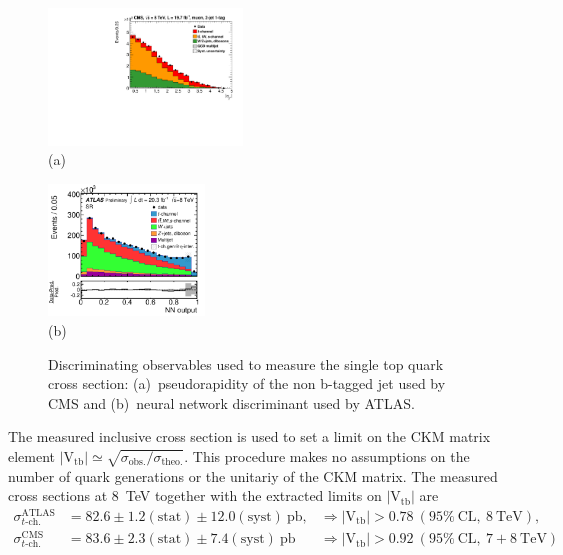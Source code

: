 \documentclass{PoS}
\begin{document}
\begin{figure}[htbp]
\begin{center}
\parbox[t]{0.5\textwidth}{\centering\includegraphics[width=0.46\textwidth]{cms_xsec8/etamuon.pdf}\\(a)}
\parbox[t]{0.42\textwidth}{\centering\includegraphics[width=0.37\textwidth]{atlas_xsec8/nnoutput.pdf}\\(b)}

\end{center}
\caption{\label{fig:fit-xsec-8}Discriminating observables used to measure the single top quark cross section: (a)~pseudorapidity of the non b-tagged jet used by CMS and (b)~neural network discriminant used by ATLAS.}

\end{figure}

The measured inclusive cross section is used to set a limit on the CKM matrix element $|\mathrm{V_{tb}}|\simeq\sqrt{\sigma_\mathrm{obs.}/\sigma_\mathrm{theo.}}$. This procedure makes no assumptions on the number of quark generations or the unitariy of the CKM matrix. The measured cross sections at 8~TeV together with the extracted limits on $\mathrm{|V_{tb}|}$ are 
\begin{align}
\sigma_{t\mbox{-}\mathrm{ch.}}^\mathrm{ATLAS}&=82.6\pm1.2\mathrm{(stat)}\pm12.0\mathrm{(syst)}~\mathrm{pb}, &\Rightarrow |\mathrm{V_{tb}}|>0.78~\mathrm{(95\%~CL,~8~TeV)}, \\
\sigma_{t\mbox{-}\mathrm{ch.}}^\mathrm{CMS}&=83.6\pm2.3\mathrm{(stat)}\pm7.4\mathrm{(syst)}~\mathrm{pb} &\Rightarrow |\mathrm{V_{tb}}|>0.92~\mathrm{(95\%~CL,~7+8~TeV)}
\end{align}
\end{document}
